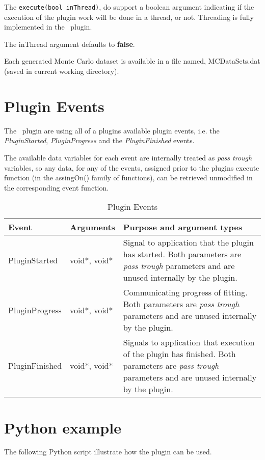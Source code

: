 The \verb|execute(bool inThread)|, do support a boolean argument indicating if the execution of the plugin work will be done in a thread, or not. Threading is fully implemented in the \pname\ plugin.

The inThread argument defaults to \textbf{false}.

Each generated Monte Carlo dataset is available in a file named, MCDataSets.dat (saved in current working directory).


\section{Plugin Events}
The \pname\ plugin are using all of a plugins available plugin events, i.e. the \emph{PluginStarted}, \emph{PluginProgress} and the \emph{PluginFinished} events.

The available data variables for each event are internally treated as \emph{pass trough} variables, so any data, for any of the events, assigned prior to
the plugins execute function (in the assingOn() family of functions), can be retrieved unmodified in the corresponding event function.

\begin{table}[ht]
\centering %
\begin{tabular}{l l p{9cm}}

Event & Arguments & Purpose and argument types \\ [0.5ex] %
\hline %
PluginStarted  	& 	void*, void*  & Signal to application that the plugin has started. Both parameters are \emph{pass trough} parameters and are unused internally by the plugin.\\[0.5ex]
PluginProgress	& 	void*, void*  & Communicating progress of fitting. Both parameters are \emph{pass trough} parameters and are unused internally by the plugin. \\[0.5ex]
PluginFinished	& 	void*, void*  & Signals to application that execution of the plugin has finished. Both parameters are \emph{pass trough} parameters and are unused internally by the plugin.\\

\hline %
\end{tabular}
\caption{Plugin Events}
\label{table:MCPluginEvents}
\end{table}

\section{Python example}
The following Python script illustrate how the plugin can be used.

